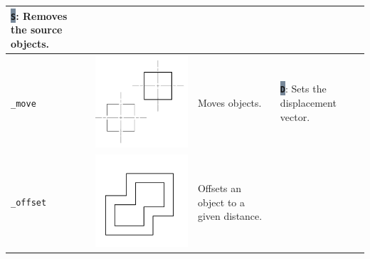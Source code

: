 \documentclass[..]{../IEEEphot}
\newcommand{\param}[1]{\colorbox{LightSlateGray}{\color{Navy}\texttt{\textbf{#1}}}}
\begin{document}
\begin{center}
\begin{longtable}{m{.2\linewidth}m{.2\linewidth}m{.25\linewidth}m{.25\linewidth}}
\param{S}: Removes the source objects.
\\		
\midrule
\texttt{\_move} & \includegraphics[width = 0.8\linewidth, keepaspectratio]{../images/jpg/_move.jpg} & Moves objects. & 
\param{D}: Sets the displacement vector.
\\			
\midrule
\texttt{\_offset} & \includegraphics[width = 0.8\linewidth, keepaspectratio]{../images/jpg/_offset.jpg} & Offsets an object to a given distance.  & 
\\			
\midrule

\end{longtable}
\end{center}
\end{document}
